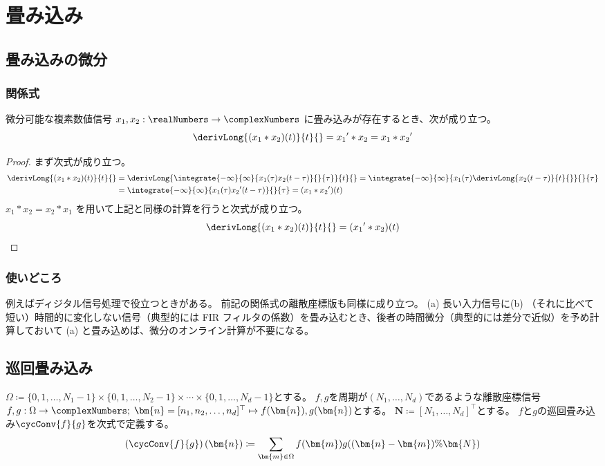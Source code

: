\part{畳み込み}
	\chapter{畳み込みの微分}
		\section{関係式}
			\begin{shadebox}
				微分可能な複素数値信号 $x_1, x_2:\realNumbers\to\complexNumbers$ に畳み込みが存在するとき、次が成り立つ。
				\[ \derivLong{(x_1*x_2)(t)}{t}{} = {x_1}'*x_2 = x_1*{x_2}' \]
			\end{shadebox}
			\begin{proof}
				\quad\par
				まず次式が成り立つ。
				\begin{align*}
					\derivLong{(x_1*x_2)(t)}{t}{} &= \derivLong{\integrate{-\infty}{\infty}{x_1(\tau)x_2(t-\tau)}{}{\tau}}{t}{} = \integrate{-\infty}{\infty}{x_1(\tau)\derivLong{x_2(t-\tau)}{t}{}}{}{\tau} \\
					&= \integrate{-\infty}{\infty}{x_1(\tau){x_2}'(t-\tau)}{}{\tau} = (x_1*{x_2}')(t)
				\end{align*}
				$x_1*x_2 = x_2*x_1$ を用いて上記と同様の計算を行うと次式が成り立つ。
				\[ \derivLong{(x_1*x_2)(t)}{t}{} = ({x_1}'*x_2)(t) \]
			\end{proof}
		\section{使いどころ}
			例えばディジタル信号処理で役立つときがある。
			前記の関係式の離散座標版も同様に成り立つ。
			(a) 長い入力信号に(b) （それに比べて短い）時間的に変化しない信号（典型的には FIR フィルタの係数）を畳み込むとき、後者の時間微分（典型的には差分で近似）を予め計算しておいて (a) と畳み込めば、微分のオンライン計算が不要になる。
	\chapter{巡回畳み込み}
		\label{巡回畳み込み}
		$\Omega \coloneqq \{0,1,\dots,N_1-1\}\times\{0,1,\dots,N_2-1\}\times\cdots\times\{0,1,\dots,N_d-1\}$とする。
		$f,g$を周期が$(N_1,\dots,N_d)$であるような離散座標信号$f,g: \Omega\to\complexNumbers;\;\bm{n} = [n_1,n_2,\dots,n_d]^\top \mapsto f(\bm{n}),g(\bm{n})$とする。
		$\bm{N} \coloneqq [N_1,\dots,N_d]^\top$とする。
		$f$と$g$の巡回畳み込み$\cycConv{f}{g}$を次式で定義する。
		\[ \left(\cycConv{f}{g}\right)(\bm{n}) \coloneqq \sum_{\bm{m} \in\Omega} f(\bm{m})g((\bm{n}-\bm{m})\%\bm{N}) \]

